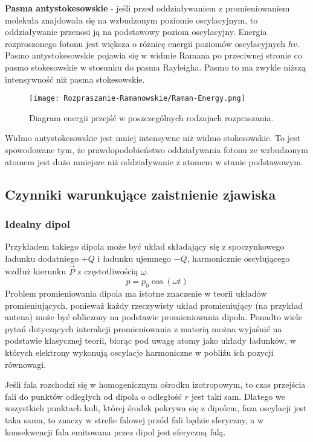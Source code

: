 \textbf{Pasma antystokesowskie} - jeśli przed oddziaływaniem z promieniowaniem molekuła znajdowała się na wzbudzonym poziomie oscylacyjnym, to oddziaływanie przenosi ją na podstawowy poziom oscylacyjny. Energia rozproszonego fotonu jest większa o różnicę energii poziomów oscylacyjnych $hv$. Pasmo antystokesowskie pojawia się w widmie Ramana po przeciwnej stronie co pasmo stokesowskie w stosunku do pasma Rayleigha. Pasmo to ma zwykle niższą intensywność niż pasma stokesowskie.
\begin{figure}[H]
	\begin{center}
		\texttt{[image: Rozpraszanie-Ramanowskie/Raman-Energy.png]}
		\caption{Diagram energii przejść w poszczególnych rodzajach rozpraszania.}
	\end{center}
\end{figure}
Widmo antystokesowskie jest mniej intensywne niż widmo stokesowskie. To jest spowodowane tym,
że prawdopodobieństwo oddziaływania fotonu ze wzbudzonym atomem jest dużo mniejsze niż
oddziaływanie z atomem w stanie podstawowym.

\subsection{Czynniki warunkujące zaistnienie zjawiska}
\subsubsection{Idealny dipol}
Przykładem takiego dipola może być układ składający się z spoczynkowego ładunku dodatniego $+Q$ i ładunku ujemnego $-Q$, harmonicznie oscylującego wzdłuż kierunku $\overrightarrow{P}$ z częstotliwością $\omega$.
\begin{equation}
	p = p_{0}\cos(\omega t)
\end{equation}
Problem promieniowania dipola ma istotne znaczenie w teorii układów promieniujących, ponieważ każdy rzeczywisty układ promieniujący (na przykład antena) może być obliczony na podstawie promieniowania dipola. Ponadto wiele pytań dotyczących interakcji promieniowania z materią można wyjaśnić na podstawie klasycznej teorii, biorąc pod uwagę atomy jako układy ładunków, w których elektrony wykonują oscylacje harmoniczne w pobliżu ich pozycji równowagi.

Jeśli fala rozchodzi się w homogenicznym ośrodku izotropowym, to czas przejścia fali do punktów odległych od dipola o odległość $r$ jest taki sam. Dlatego we wszystkich punktach kuli, której środek pokrywa się z dipolem, faza oscylacji jest taka sama, to znaczy w strefie falowej przód fali będzie sferyczny, a w konsekwencji fala emitowana przez dipol jest sferyczną falą.

